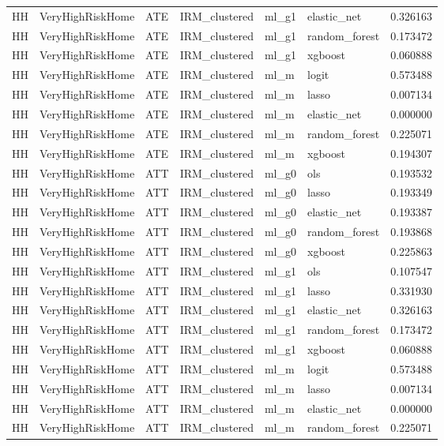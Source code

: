 \begin{longtable}{llllllr}
HH & VeryHighRiskHome & ATE & IRM\_clustered & ml\_g1 & elastic\_net & 0.326163 \\
HH & VeryHighRiskHome & ATE & IRM\_clustered & ml\_g1 & random\_forest & 0.173472 \\
HH & VeryHighRiskHome & ATE & IRM\_clustered & ml\_g1 & xgboost & 0.060888 \\
HH & VeryHighRiskHome & ATE & IRM\_clustered & ml\_m & logit & 0.573488 \\
HH & VeryHighRiskHome & ATE & IRM\_clustered & ml\_m & lasso & 0.007134 \\
HH & VeryHighRiskHome & ATE & IRM\_clustered & ml\_m & elastic\_net & 0.000000 \\
HH & VeryHighRiskHome & ATE & IRM\_clustered & ml\_m & random\_forest & 0.225071 \\
HH & VeryHighRiskHome & ATE & IRM\_clustered & ml\_m & xgboost & 0.194307 \\
HH & VeryHighRiskHome & ATT & IRM\_clustered & ml\_g0 & ols & 0.193532 \\
HH & VeryHighRiskHome & ATT & IRM\_clustered & ml\_g0 & lasso & 0.193349 \\
HH & VeryHighRiskHome & ATT & IRM\_clustered & ml\_g0 & elastic\_net & 0.193387 \\
HH & VeryHighRiskHome & ATT & IRM\_clustered & ml\_g0 & random\_forest & 0.193868 \\
HH & VeryHighRiskHome & ATT & IRM\_clustered & ml\_g0 & xgboost & 0.225863 \\
HH & VeryHighRiskHome & ATT & IRM\_clustered & ml\_g1 & ols & 0.107547 \\
HH & VeryHighRiskHome & ATT & IRM\_clustered & ml\_g1 & lasso & 0.331930 \\
HH & VeryHighRiskHome & ATT & IRM\_clustered & ml\_g1 & elastic\_net & 0.326163 \\
HH & VeryHighRiskHome & ATT & IRM\_clustered & ml\_g1 & random\_forest & 0.173472 \\
HH & VeryHighRiskHome & ATT & IRM\_clustered & ml\_g1 & xgboost & 0.060888 \\
HH & VeryHighRiskHome & ATT & IRM\_clustered & ml\_m & logit & 0.573488 \\
HH & VeryHighRiskHome & ATT & IRM\_clustered & ml\_m & lasso & 0.007134 \\
HH & VeryHighRiskHome & ATT & IRM\_clustered & ml\_m & elastic\_net & 0.000000 \\
HH & VeryHighRiskHome & ATT & IRM\_clustered & ml\_m & random\_forest & 0.225071 \\

\end{longtable}
